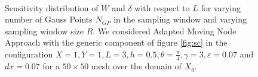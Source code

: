 \begin{figure}[ht]
\centering
{}%
     \\
    \caption{Sensitivity distribution of $W$ and $\delta$ with respect to $L$ for varying number of Gauss Points $N_{GP}$ in the sampling window and varying sampling window size $R$. We considered Adapted Moving Node Approach with the generic component of figure \ref{fig:sc} in the configuration  $X=1,Y=1,L=3,h=0.5,\theta=\frac{\pi}{4}, \gamma=3, \varepsilon=0.07$ and  $dx=0.07$ for a $50\times50$ mesh over the domain of $X_g$.}%
    \label{fig:sensL}%
\end{figure}
